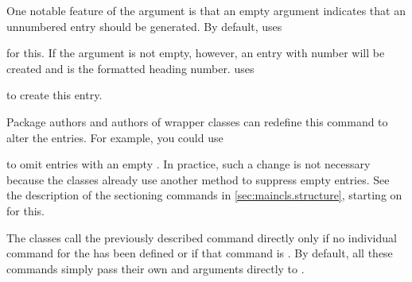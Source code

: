 One notable feature of the  argument is that an empty argument
indicates that an unnumbered entry should be generated. By default,
\KOMAScript{} uses
\begin{quote}
\end{quote}
for this. If the argument is not empty, however, an entry with number
will be created and  is the formatted heading
number. \KOMAScript{} uses
\begin{quote}\raggedright
\end{quote}
to create this entry.

Package authors and authors of wrapper classes can redefine this command to
alter the entries. For example, you could use
\begin{lstcode}
  \renewcommand{\addtocentrydefault}[3]{%
    \ifstr{#3}{}{%
      \ifstr{#2}{}{%
        \addcontentsline{toc}{#1}{#3}%
      }{%
        \addcontentsline{toc}{#1}{\protect\numberline{#2}#3}%
      }%
    }%
  }%
\end{lstcode}
to omit entries with an empty . In practice,
such a change is not necessary because the \KOMAScript{} classes already use
another method to suppress empty entries. See the description of the
sectioning commands in \autoref{sec:maincls.structure}, starting on
 for this.%
%
\EndIndexGroup


\begin{Declaration}
\end{Declaration}%
The \KOMAScript{} classes call the previously described
command
%
 directly only if no
individual command for the  has been defined or if that command
is . By default, all
these commands simply pass their own  and arguments directly to
.%
%
\EndIndexGroup


